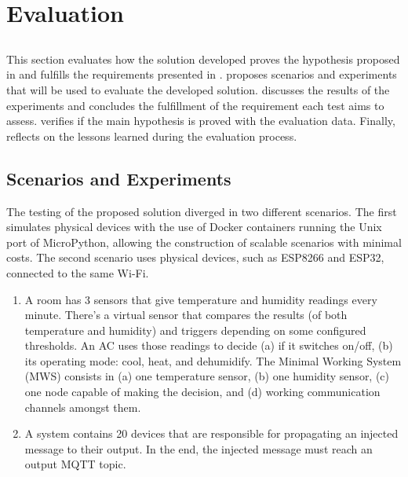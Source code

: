 \chapter{Evaluation} \label{chap:evaluation}

\section*{}

\minitoc \mtcskip \noindent
This section evaluates how the solution developed proves the hypothesis proposed in  and fulfills the requirements presented in .  proposes scenarios and experiments that will be used to evaluate the developed solution.  discusses the results of the experiments and concludes the fulfillment of the requirement each test aims to assess.  verifies if the main hypothesis is proved with the evaluation data. Finally,  reflects on the lessons learned during the evaluation process. 

\section{Scenarios and Experiments}\label{sec:scenarios_experiments}

The testing of the proposed solution diverged in two different scenarios. The first simulates physical devices with the use of Docker containers running the Unix port of MicroPython, allowing the construction of scalable scenarios with minimal costs. The second scenario uses physical devices, such as ESP8266 and ESP32, connected to the same Wi-Fi.

\begin{enumerate}
    \item A room has 3 sensors that give temperature and humidity readings every minute. There’s a virtual sensor that compares the results (of both temperature and humidity) and triggers depending on some configured thresholds. An AC uses those readings to decide (a) if it switches on/off, (b) its operating mode: cool, heat, and dehumidify. The Minimal Working System (MWS) consists in (a) one temperature sensor, (b) one humidity sensor, (c) one node capable of making the decision, and (d) working communication channels amongst them.
    \item A system contains 20 devices that are responsible for propagating an injected message to their output. In the end, the injected message must reach an output MQTT topic.
\end{enumerate}

